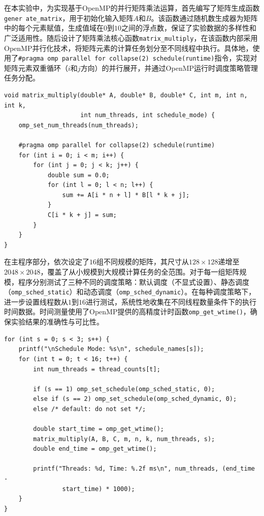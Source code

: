 \documentclass[a4paper, utf8]{ctexart}
\begin{document}
	在本实验中，为实现基于OpenMP的并行矩阵乘法运算，首先编写了矩阵生成函数\verb|gener|\ \verb|ate_matrix|，用于初始化输入矩阵$A$和$B$。该函数通过随机数生成器为矩阵中的每个元素赋值，生成值域在$0$到$10$之间的浮点数，保证了实验数据的多样性和广泛适用性。随后设计了矩阵乘法核心函数\verb|matrix_multiply|，在该函数内部采用OpenMP并行化技术，将矩阵元素的计算任务划分至不同线程中执行。具体地，使用了\verb|#pragma omp parallel for collapse(2)|\ \verb|schedule(runtime)|指令，实现对矩阵元素双重循环（$i$和$j$方向）的并行展开，并通过OpenMP运行时调度策略管理任务分配。
	
	\begin{verbatim}
void matrix_multiply(double* A, double* B, double* C, int m, int n, int k, 
                     int num_threads, int schedule_mode) {
    omp_set_num_threads(num_threads);

    #pragma omp parallel for collapse(2) schedule(runtime)
    for (int i = 0; i < m; i++) {
        for (int j = 0; j < k; j++) {
            double sum = 0.0;
            for (int l = 0; l < n; l++) {
                sum += A[i * n + l] * B[l * k + j];
            }
            C[i * k + j] = sum;
        }
    }
}
	\end{verbatim}
	
	在主程序部分，依次设定了$16$组不同规模的矩阵，其尺寸从$128\times128$递增至$2048\times2048$，覆盖了从小规模到大规模计算任务的全范围。对于每一组矩阵规模，程序分别测试了三种不同的调度策略：默认调度（不显式设置）、静态调度（\verb|omp_sched_static|）和动态调度（\verb|omp_sched_dynamic|）。在每种调度策略下，进一步设置线程数从$1$到$16$进行测试，系统性地收集在不同线程数量条件下的执行时间数据。时间测量使用了OpenMP提供的高精度计时函数\verb|omp_get_wtime()|，确保实验结果的准确性与可比性。
	
	\begin{verbatim}
for (int s = 0; s < 3; s++) {
    printf("\nSchedule Mode: %s\n", schedule_names[s]);
    for (int t = 0; t < 16; t++) {
        int num_threads = thread_counts[t];

        if (s == 1) omp_set_schedule(omp_sched_static, 0);
        else if (s == 2) omp_set_schedule(omp_sched_dynamic, 0);
        else /* default: do not set */;

        double start_time = omp_get_wtime();
        matrix_multiply(A, B, C, m, n, k, num_threads, s);
        double end_time = omp_get_wtime();

        printf("Threads: %d, Time: %.2f ms\n", num_threads, (end_time - 
                start_time) * 1000);
    }
}
	\end{verbatim}
	
\end{document}
